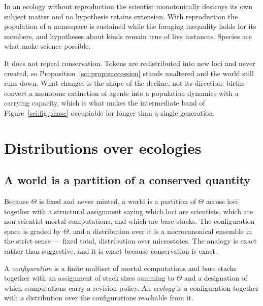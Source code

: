 \begin{proposition}
\label{sci:prop:kinds}
In an ecology without reproduction the scientist monotonically destroys its own subject matter and no
hypothesis retains extension. With reproduction the population of a namespace is sustained while the
foraging inequality holds for its members, and hypotheses about kinds remain true of live instances.
Species are what make science possible.
\end{proposition}

\begin{remark}
\label{sci:rem:nofix}
It does not repeal conservation. Tokens are redistributed into new loci and never created, so
Proposition~\ref{sci:prop:succession} stands unaltered and the world still runs down. What changes is the
shape of the decline, not its direction: births convert a monotone extinction of agents into a
population dynamics with a carrying capacity, which is what makes the intermediate band of
Figure~\ref{sci:fig:phase} occupiable for longer than a single generation.
\end{remark}

\section{Distributions over ecologies}\label{sci:S13}
\label{sci:sec:distributions}

\subsection{A world is a partition of a conserved quantity}\label{sci:S13.1}

Because $\Theta$ is fixed and never minted, a world is a partition of $\Theta$ across loci together
with a structural assignment saying which loci are scientists, which are non-scientist mortal
computations, and which are bare stacks. The configuration space is graded by $\Theta$, and a
distribution over it is a microcanonical ensemble in the strict sense --- fixed total, distribution
over microstates. The analogy is exact rather than suggestive, and it is exact because conservation
is exact.

\begin{definition}\label{sci:configuration-ecology}
A \emph{configuration} is a finite multiset of mortal computations and bare stacks together with an
assignment of stack sizes summing to $\Theta$ and a designation of which computations carry a revision
policy. An \emph{ecology} is a configuration together with a distribution over the configurations
reachable from it.
\end{definition}

